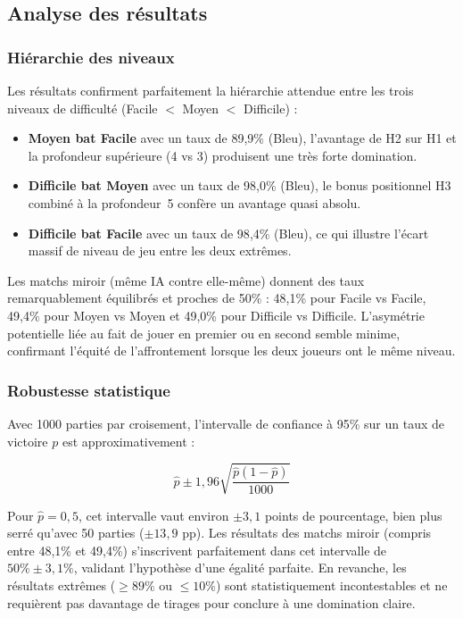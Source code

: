\documentclass[12pt, a4paper]{article}
\begin{document}
\subsection{Analyse des résultats}

\subsubsection{Hiérarchie des niveaux}

Les résultats confirment parfaitement la hiérarchie attendue entre les trois niveaux de
difficulté (Facile $<$ Moyen $<$ Difficile) :

\begin{itemize}
  \item \textbf{Moyen bat Facile} avec un taux de 89{,}9\% (Bleu), l'avantage de H2 sur H1
        et la profondeur supérieure (4 vs 3) produisent une très forte domination.
  \item \textbf{Difficile bat Moyen} avec un taux de 98{,}0\% (Bleu), le bonus positionnel H3
        combiné à la profondeur~5 confère un avantage quasi absolu.
  \item \textbf{Difficile bat Facile} avec un taux de 98{,}4\% (Bleu), ce qui illustre 
        l'écart massif de niveau de jeu entre les deux extrêmes.
\end{itemize}

Les matchs miroir (même IA contre elle-même) donnent des taux remarquablement équilibrés et proches de 50\% :
48{,}1\% pour Facile vs Facile, 49{,}4\% pour Moyen vs Moyen et 49{,}0\% pour Difficile
vs Difficile. L'asymétrie potentielle liée au fait de jouer en premier ou en second semble 
minime, confirmant l'équité de l'affrontement lorsque les deux joueurs ont le même niveau.

\subsubsection{Robustesse statistique}

Avec 1000 parties par croisement, l'intervalle de confiance à 95\% sur un taux de victoire $p$
est approximativement :

\begin{equation}
  \hat{p} \pm 1{,}96 \sqrt{\frac{\hat{p}(1-\hat{p})}{1000}}
\end{equation}

Pour $\hat{p} = 0{,}5$, cet intervalle vaut environ $\pm 3{,}1$ points de pourcentage, bien plus
serré qu'avec 50 parties ($\pm 13{,}9$ pp). Les résultats des matchs miroir (compris entre 48{,}1\% et 49{,}4\%) s'inscrivent parfaitement dans cet intervalle de $50\% \pm 3{,}1\%$, validant l'hypothèse d'une égalité parfaite. En revanche,
les résultats extrêmes ($\geq 89\%$ ou $\leq 10\%$) sont statistiquement incontestables et ne
requièrent pas davantage de tirages pour conclure à une domination claire.
\end{document}

